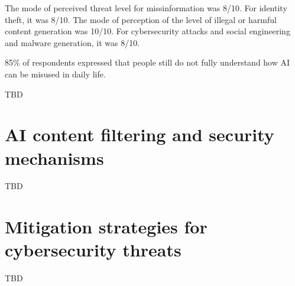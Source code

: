 The mode of perceived threat level for missinformation was 8/10.
For identity theft, it was 8/10.
The mode of perception of the level of illegal or harmful content generation was 10/10.
For cybersecurity attacks and social engineering and malware generation, it was 8/10.


85\% of respondents expressed that people still do not fully understand how AI can be misused in daily life.

TBD

\section{AI content filtering and security mechanisms}

TBD



\section{Mitigation strategies for cybersecurity threats}
TBD


